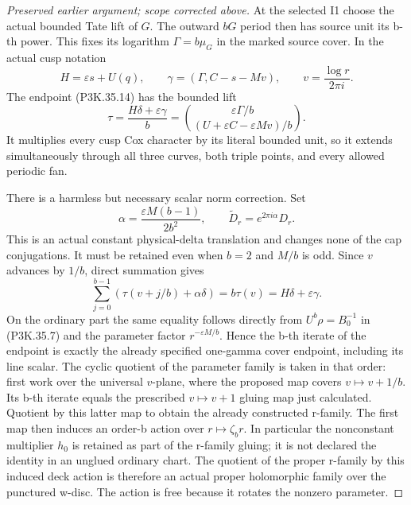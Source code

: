 \begin{proof}[Preserved earlier argument; scope corrected above]
At the selected I1 choose the actual bounded Tate lift of \(G\).
The outward \(bG\) period then has source unit its b-th power.
This fixes its logarithm \(\Gamma=b\mu_G\) in the marked source
cover. In the actual cusp notation
\[
 H=\varepsilon s+U(q),\qquad
 \gamma=(\Gamma,C-s-Mv),\qquad v=\frac{\log r}{2\pi i}.
\]
The endpoint (P3K.35.14) has the bounded lift
\[
       \tau=\frac{H\delta+\varepsilon\gamma}{b}
          =\binom{\varepsilon\Gamma/b}
                  {(U+\varepsilon C-\varepsilon Mv)/b}.
                                                               \tag{P3K.35.17}
\]
It multiplies every cusp Cox character by its literal bounded
unit, so it extends simultaneously through all three curves,
both triple points, and every allowed periodic fan.

There is a harmless but necessary scalar norm correction. Set
\[
 \alpha=\frac{\varepsilon M(b-1)}{2b^2},\qquad
 \widetilde D_r=e^{2\pi i\alpha}D_r.
                                                               \tag{P3K.35.18}
\]
This is an actual constant physical-delta translation and changes
none of the cap conjugations. It must be retained even when
\(b=2\) and \(M/b\) is odd. Since \(v\) advances by \(1/b\),
direct summation gives
\[
 \sum_{j=0}^{b-1}(\tau(v+j/b)+\alpha\delta)
                         =b\tau(v)=H\delta+\varepsilon\gamma.
                                                               \tag{P3K.35.19}
\]
On the ordinary part the same equality follows directly from
\(U^b\rho=B_0^{-1}\) in (P3K.35.7) and the parameter factor
\(r^{-\varepsilon M/b}\). Hence the b-th iterate of the
endpoint is exactly the already specified one-gamma cover
endpoint, including its line scalar. The cyclic quotient of the
parameter family is taken in that order: first work over the
universal \(v\)-plane, where the proposed map covers
\(v\mapsto v+1/b\). Its b-th iterate equals the prescribed
\(v\mapsto v+1\) gluing map just calculated. Quotient by this
latter map to obtain the already constructed r-family. The first
map then induces an order-b action over \(r\mapsto\zeta_b r\).
In particular the nonconstant multiplier \(h_0\) is retained
as part of the r-family gluing; it is not declared the identity
in an unglued ordinary chart. The quotient of the
proper r-family by this induced deck action is therefore an actual
proper holomorphic family over the punctured w-disc. The action
is free because it rotates the nonzero parameter.


\end{proof}
